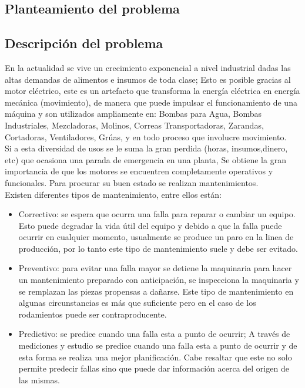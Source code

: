 \setcounter{page}{1}

\begin{center}
	\section{Planteamiento del problema}
\end{center}


\subsection{Descripción del problema}

	En la actualidad se vive un crecimiento exponencial a nivel industrial dadas las altas demandas de alimentos e insumos de toda clase; Esto es posible gracias al motor eléctrico, este es un artefacto que transforma la energía eléctrica en energía mecánica (movimiento), de manera que puede impulsar el funcionamiento de una máquina y son utilizados ampliamente en: Bombas para Agua, Bombas Industriales, Mezcladoras, Molinos, Correas Transportadoras, Zarandas, Cortadoras, Ventiladores, Grúas, y en todo proceso que involucre movimiento.\\
	Si a esta diversidad de usos se le suma la gran perdida (horas, insumos,dinero, etc) que ocasiona una parada de emergencia en una planta, Se obtiene la gran importancia de que los motores se encuentren completamente operativos y funcionales. Para procurar su buen estado se realizan mantenimientos.\\



	Existen diferentes tipos de mantenimiento, entre ellos están: 
	\begin{itemize}
		\item Correctivo: se espera que ocurra una falla para
	reparar o cambiar un equipo. Esto puede degradar la vida útil del equipo y debido a que la falla puede ocurrir en cualquier momento, usualmente se produce un paro en la linea de producción, por lo tanto este tipo de mantenimiento suele y debe ser evitado.

		\item Preventivo: para evitar una falla mayor se detiene la maquinaria para hacer un mantenimiento preparado con anticipación, se inspecciona la maquinaria y se remplazan las piezas propensas a dañarse. Este tipo de mantenimiento en algunas circunstancias es más que suficiente pero en el caso de los rodamientos puede ser contraproducente.

		\item Predictivo: se predice cuando una falla esta a punto de ocurrir; A través de mediciones y estudio se predice cuando una falla esta a punto de ocurrir y de esta forma se realiza una mejor planificación. Cabe resaltar que este no solo permite predecir fallas sino que puede dar
		información acerca del origen de las mismas.
	\end{itemize}

